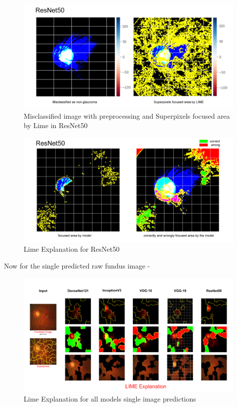 \vspace{5mm}
\begin{figure}[hbt!]
\centering
\includegraphics[scale=0.45]{images/fig-50.png}
\caption{Misclassified image with preprocessing and Superpixels focused area by Lime in ResNet50}
\label{fig:x Misclassified image with preprocessing and Superpixels focused area by Lime in ResNet50}
\end{figure}

\vspace{5mm}
\begin{figure}[hbt!]
\centering
\includegraphics[scale=0.45]{images/fig-51.png}
\caption{Lime Explanation for ResNet50}
\label{fig:x Lime Explanation for ResNet50}
\end{figure}

\newpage
\vspace{5mm}
Now for the single predicted raw fundus image -

\vspace{5mm}
\begin{figure}[hbt!]
\centering
\includegraphics[scale=0.20]{images/fig-52.png}
\caption{Lime Explanation for all models single image predictions}
\label{fig:x Lime Explanation for all models single image predictions}
\end{figure}

